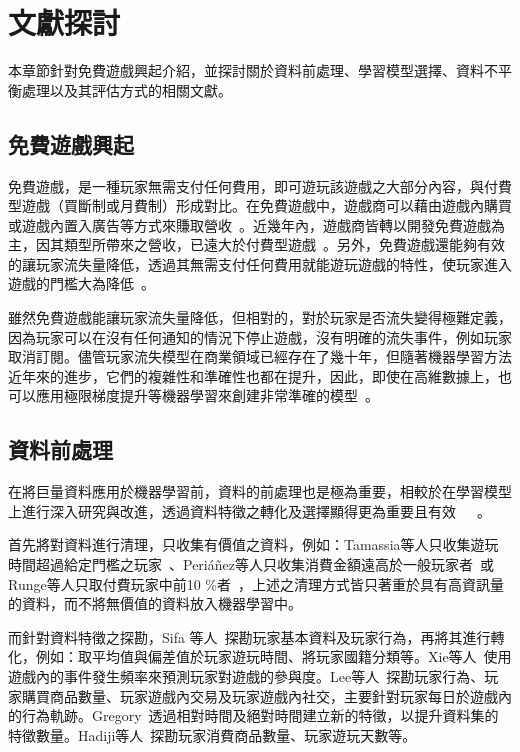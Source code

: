 \chapter{文獻探討}
\label{cha:RelatedWork}

本章節針對免費遊戲興起介紹，並探討關於資料前處理、學習模型選擇、資料不平衡處理以及其評估方式的相關文獻。

\section{免費遊戲興起}

免費遊戲，是一種玩家無需支付任何費用，即可遊玩該遊戲之大部分內容，與付費型遊戲（買斷制或月費制）形成對比。在免費遊戲中，遊戲商可以藉由遊戲內購買或遊戲內置入廣告等方式來賺取營收~\cite{wiki:f2p}。近幾年內，遊戲商皆轉以開發免費遊戲為主，因其類型所帶來之營收，已遠大於付費型遊戲~\cite{lee2018game}。另外，免費遊戲還能夠有效的讓玩家流失量降低，透過其無需支付任何費用就能遊玩遊戲的特性，使玩家進入遊戲的門檻大為降低~\cite{10.1007/978-3-030-27355-2_10}。

雖然免費遊戲能讓玩家流失量降低，但相對的，對於玩家是否流失變得極難定義，因為玩家可以在沒有任何通知的情況下停止遊戲，沒有明確的流失事件，例如玩家取消訂閱。儘管玩家流失模型在商業領域已經存在了幾十年，但隨著機器學習方法近年來的進步，它們的複雜性和準確性也都在提升，因此，即使在高維數據上，也可以應用極限梯度提升等機器學習來創建非常準確的模型~\cite{XGBoostTemporalData}。

\section{資料前處理}

在將巨量資料應用於機器學習前，資料的前處理也是極為重要，相較於在學習模型上進行深入研究與改進，透過資料特徵之轉化及選擇顯得更為重要且有效~\cite{SupervisedMachineLearning}~\cite{lee2018game}~\cite{XGBoostTemporalData}。

首先將對資料進行清理，只收集有價值之資料，例如：Tamassia等人只收集遊玩時間超過給定門檻之玩家~\cite{tamassia2016predicting}、Periáñez等人只收集消費金額遠高於一般玩家者~\cite{perianez2016churn}或Runge等人只取付費玩家中前10 \%者~\cite{runge2014churn}，上述之清理方式皆只著重於具有高資訊量的資料，而不將無價值的資料放入機器學習中。

而針對資料特徵之探勘，Sifa 等人~\cite{sifa2015predicting}探勘玩家基本資料及玩家行為，再將其進行轉化，例如：取平均值與偏差值於玩家遊玩時間、將玩家國籍分類等。Xie等人~\cite{PredictionWithEventFrequency}使用遊戲內的事件發生頻率來預測玩家對遊戲的參與度。Lee等人~\cite{lee2016predicting}探勘玩家行為、玩家購買商品數量、玩家遊戲內交易及玩家遊戲內社交，主要針對玩家每日於遊戲內的行為軌跡。Gregory~\cite{XGBoostTemporalData}透過相對時間及絕對時間建立新的特徵，以提升資料集的特徵數量。Hadiji等人~\cite{6932876}探勘玩家消費商品數量、玩家遊玩天數等。

